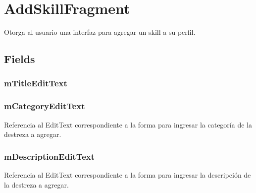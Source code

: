 \documentclass[letterpaper,10pt,english]{sphinxmanual}
\begin{document}
\section{AddSkillFragment}
\label{Fragments/AddSkillFragment:addskillfragment}\label{Fragments/AddSkillFragment::doc}

\begin{fulllineitems}
\label{Fragments/AddSkillFragment:com.fiuba.tallerii.jobify.AddSkillFragment}
Otorga al usuario una interfaz para agregar un skill a su perfil.

\end{fulllineitems}



\subsection{Fields}
\label{Fragments/AddSkillFragment:fields}

\subsubsection{mTitleEditText}
\label{Fragments/AddSkillFragment:mtitleedittext}

\subsubsection{mCategoryEditText}
\label{Fragments/AddSkillFragment:mcategoryedittext}

\begin{fulllineitems}
\label{Fragments/AddSkillFragment:com.fiuba.tallerii.jobify.AddSkillFragment.mCategoryEditText}
Referencia al EditText correspondiente a la forma para ingresar la categoría de la destreza a agregar.

\end{fulllineitems}



\subsubsection{mDescriptionEditText}
\label{Fragments/AddSkillFragment:mdescriptionedittext}

\begin{fulllineitems}
\label{Fragments/AddSkillFragment:com.fiuba.tallerii.jobify.AddSkillFragment.mDescriptionEditText}
Referencia al EditText correspondiente a la forma para ingresar la descripción de la destreza a agregar.

\end{fulllineitems}
\end{document}
